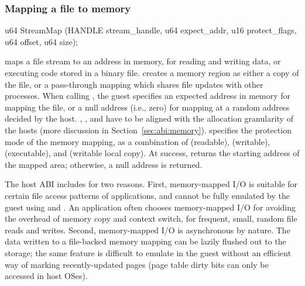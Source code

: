 


\subsubsection*{Mapping a file to memory}
                   
\begin{paldef}            
u64 StreamMap (HANDLE stream_handle, u64 expect_addr,
               u16 protect_flags, u64 offset, u64 size);
\end{paldef}


 maps a file stream to an address in memory, for reading and writing data, or executing code stored in a binary file.
 creates a memory region
as either a copy of the file,
or a pass-through mapping which shares file updates with other processes.
When calling ,
the guest specifies an expected address in memory for mapping the file, or a null address (i.e., zero) for mapping at a random address decided by the host.
, , and  have to be aligned
with the allocation granularity of the hosts (more discussion in Section~\ref{sec:abi:memory}).
 specifies the protection mode
of the memory mapping, as a combination of  (readable),  (writable),  (executable), and  (writable local copy).
At success,  returns the starting address of the mapped area; otherwise, a null address is returned.




The host ABI includes  for two reasons. First, memory-mapped I/O is suitable for certain file access patterns of applications, and cannot be fully emulated by the guest using  and .
An application often chooses memory-mapped I/O for
avoiding the overhead of memory copy and context switch, %
for frequent, small, random file reads and writes.
Second, memory-mapped I/O is asynchronous by nature.
The data written to a file-backed memory mapping can be lazily flushed out to the storage;
the same feature is difficult to emulate in the guest
without an efficient way of marking recently-updated pages (page table dirty bits can only be accessed in host OSes).




